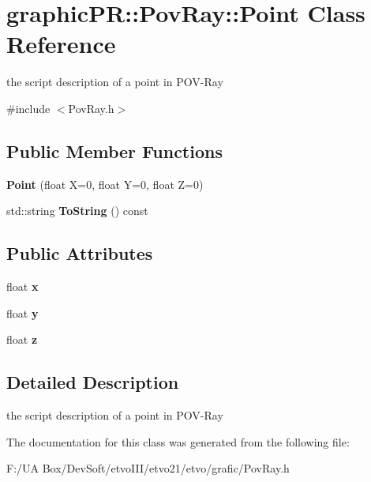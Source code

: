 \section{graphic\+PR\+:\+:Pov\+Ray\+:\+:Point Class Reference}
\label{classgraphic_p_r_1_1_pov_ray_1_1_point}


the script description of a point in P\+O\+V-\/\+Ray  




{\ttfamily \#include $<$Pov\+Ray.\+h$>$}

\subsection*{Public Member Functions}
\begin{DoxyCompactItemize}
\item 
\mbox{\label{classgraphic_p_r_1_1_pov_ray_1_1_point_af2b101fab017a294414e04b37479ff2e}} 
{\bfseries Point} (float X=0, float Y=0, float Z=0)
\item 
\mbox{\label{classgraphic_p_r_1_1_pov_ray_1_1_point_a2a1ba72e55e03b5077137f5a87e7263d}} 
std\+::string {\bfseries To\+String} () const
\end{DoxyCompactItemize}
\subsection*{Public Attributes}
\begin{DoxyCompactItemize}
\item 
\mbox{\label{classgraphic_p_r_1_1_pov_ray_1_1_point_a5cbe3f90db8c633df58d56d0d1bbeb4b}} 
float {\bfseries x}
\item 
\mbox{\label{classgraphic_p_r_1_1_pov_ray_1_1_point_ac4fff265720fdf38b167a9591421f8b6}} 
float {\bfseries y}
\item 
\mbox{\label{classgraphic_p_r_1_1_pov_ray_1_1_point_ae268260b962a44f8d9cf518bbb877247}} 
float {\bfseries z}
\end{DoxyCompactItemize}


\subsection{Detailed Description}
the script description of a point in P\+O\+V-\/\+Ray 

The documentation for this class was generated from the following file\+:\begin{DoxyCompactItemize}
\item 
F\+:/\+U\+A Box/\+Dev\+Soft/etvo\+I\+I\+I/etvo21/etvo/grafic/Pov\+Ray.\+h\end{DoxyCompactItemize}
